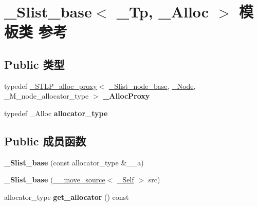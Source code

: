 \hypertarget{class___slist__base}{}\section{\+\_\+\+Slist\+\_\+base$<$ \+\_\+\+Tp, \+\_\+\+Alloc $>$ 模板类 参考}
\label{class___slist__base}
\subsection*{Public 类型}
\begin{DoxyCompactItemize}
\item 
\mbox{\label{class___slist__base_a51a17b41dcd932adc1c05d646a439072}} 
typedef \hyperlink{class___s_t_l_p__alloc__proxy}{\+\_\+\+S\+T\+L\+P\+\_\+alloc\+\_\+proxy}$<$ \hyperlink{struct___slist__node__base}{\+\_\+\+Slist\+\_\+node\+\_\+base}, \hyperlink{class___slist__node}{\+\_\+\+Node}, \+\_\+\+M\+\_\+node\+\_\+allocator\+\_\+type $>$ {\bfseries \+\_\+\+Alloc\+Proxy}
\item 
\mbox{\label{class___slist__base_a3ea77e7073661db4c8500746aab686d4}} 
typedef \+\_\+\+Alloc {\bfseries allocator\+\_\+type}
\end{DoxyCompactItemize}
\subsection*{Public 成员函数}
\begin{DoxyCompactItemize}
\item 
\mbox{\label{class___slist__base_aec96d1635bb0ea701dfc1e2f5ca81e15}} 
{\bfseries \+\_\+\+Slist\+\_\+base} (const allocator\+\_\+type \&\+\_\+\+\_\+a)
\item 
\mbox{\label{class___slist__base_aec069b2034c784f57906fac0f85d90ef}} 
{\bfseries \+\_\+\+Slist\+\_\+base} (\hyperlink{class____move__source}{\+\_\+\+\_\+move\+\_\+source}$<$ \hyperlink{class___slist__base}{\+\_\+\+Self} $>$ src)
\item 
\mbox{\label{class___slist__base_a270156fbd821fea340cf8f322eeb4233}} 
allocator\+\_\+type {\bfseries get\+\_\+allocator} () const
\end{DoxyCompactItemize}
